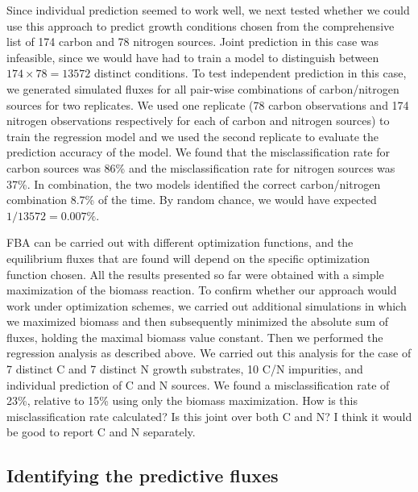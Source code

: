 \documentclass[12pt]{article}
\begin{document}
Since individual prediction seemed to work well, we next tested whether we could use this approach to predict growth conditions chosen from the comprehensive list of 174 carbon and 78 nitrogen sources. Joint prediction in this case was infeasible, since we would have had to train a model to distinguish between $174\times78=13572$ distinct conditions. To test independent prediction in this case, we generated simulated fluxes for all pair-wise combinations of carbon/nitrogen sources for two replicates. We used one replicate (78 carbon observations and 174 nitrogen observations respectively for each of carbon and nitrogen sources) to train the regression model and we used the second replicate to evaluate the prediction accuracy of the model. We found that the misclassification rate for carbon sources was 86\% and the misclassification rate for nitrogen sources was 37\%. In combination, the two models identified the correct carbon/nitrogen combination 8.7\% of the time. By random chance, we would have expected $1/13572=0.007\%$.

FBA can be carried out with different optimization functions, and the equilibrium fluxes that are found will depend on the specific optimization function chosen. All the results presented so far were obtained with a simple maximization of the biomass reaction. To confirm whether our approach would work under optimization schemes, we carried out additional simulations in which we maximized biomass and then subsequently minimized the absolute sum of fluxes, holding the maximal biomass value constant. Then we performed the regression analysis as described above. We carried out this analysis for the case of 7 distinct C and 7 distinct N growth substrates, 10 C/N impurities, and individual prediction of C and N sources. We found a misclassification rate of 23\%, relative to 15\% using only the biomass maximization. {\color{red}How is this misclassification rate calculated? Is this joint over both C and N? I think it would be good to report C and N separately.}


\subsection{Identifying the predictive fluxes}
\end{document}
